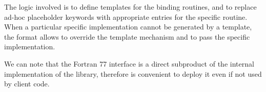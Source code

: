 The logic involved is to define templates for the binding routines, and to
replace ad-hoc placeholder keywords with appropriate entries for the
specific routine. When a particular specific implementation cannot be
generated by a template, the format allows to override the template
mechanism and to pass the specific implementation.

We can note that the Fortran 77 interface is a direct subproduct of the
internal implementation of the library, therefore is convenient to deploy it
even if not used by client code. 

%
%
%
%
%
